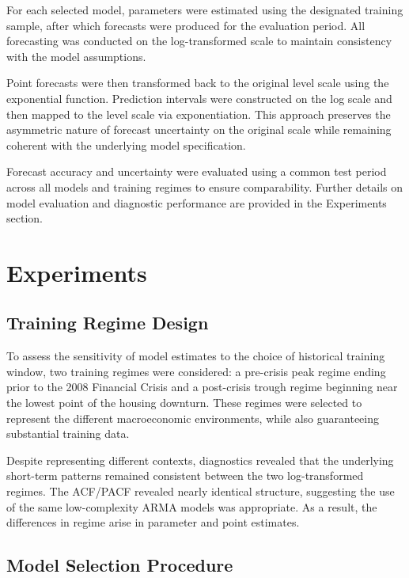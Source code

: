 \documentclass[10pt,twocolumn,letterpaper]{article}
\begin{document}
For each selected model, parameters were estimated using the designated training sample, after which forecasts were produced for the evaluation period. All forecasting was conducted on the log-transformed scale to maintain consistency with the model assumptions.

Point forecasts were then transformed back to the original level scale using the exponential function. Prediction intervals were constructed on the log scale and then mapped to the level scale via exponentiation. This approach preserves the asymmetric nature of forecast uncertainty on the original scale while remaining coherent with the underlying model specification.

Forecast accuracy and uncertainty were evaluated using a common test period across all models and training regimes to ensure comparability. Further details on model evaluation and diagnostic performance are provided in the Experiments section.

\section{Experiments}
\label{sec:experiments}

\subsection{Training Regime Design}

To assess the sensitivity of model estimates to the choice of historical training window, two training regimes were considered: a pre-crisis peak regime ending prior to the 2008 Financial Crisis and a post-crisis trough regime beginning near the lowest point of the housing downturn. These regimes were selected to represent the different macroeconomic environments, while also guaranteeing substantial training data.

Despite representing different contexts, diagnostics revealed that the underlying short-term patterns remained consistent between the two log-transformed regimes. The ACF/PACF revealed nearly identical structure, suggesting the use of the same low-complexity ARMA models was appropriate. As a result, the differences in regime arise in parameter and point estimates.



\subsection{Model Selection Procedure}
\end{document}
